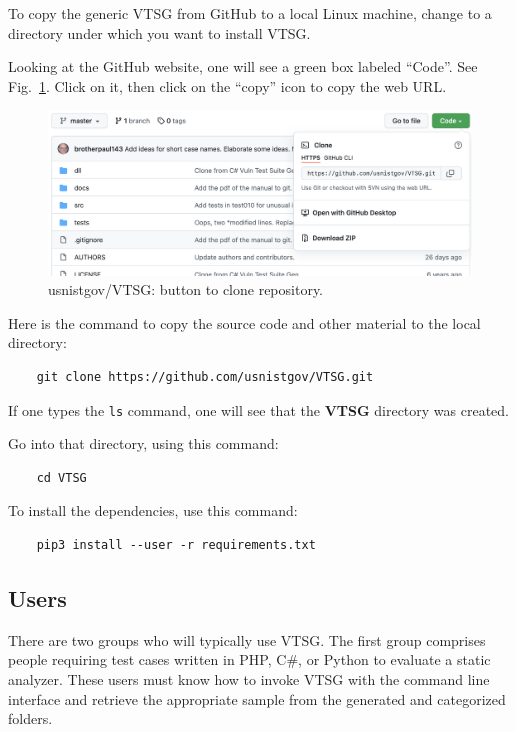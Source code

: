 \documentclass[12pt]{article}
\newcommand{\CSharp}{C{\fontseries{b}\selectfont\#}}
\begin{document}
\noindent To copy the generic VTSG from GitHub to a local Linux machine, change to a
directory under which you want to install VTSG.

\noindent Looking at the GitHub website, one will see a green box labeled ``Code''.
See Fig.~\ref{fig:clone button}.
Click on it, then click on the ``copy'' icon to copy the web URL.

\begin{figure}[htbp]
  \includegraphics[width=1\linewidth]{fig_clone_tab.png}
  \caption{usnistgov/VTSG: button to clone repository.}
  \label{fig:clone button}
\end{figure}

\noindent Here is the command to copy the source code and other material to the local
directory:

\begin{verbatim}
    git clone https://github.com/usnistgov/VTSG.git
\end{verbatim}

\noindent If one types the \verb|ls| command, one will see that the \textbf{VTSG}
directory was created.

\noindent Go into that directory, using this command:

\begin{verbatim}
    cd VTSG
\end{verbatim}

\noindent To install the dependencies, use this command:

\begin{verbatim}
    pip3 install --user -r requirements.txt
\end{verbatim}


\subsection{Users}

There are two groups who will typically use VTSG. The first group comprises people
requiring test cases written in PHP, \CSharp, or Python to evaluate a static
analyzer. These users must know how to invoke VTSG with the command line interface
and retrieve the appropriate sample from the generated and categorized folders.
\end{document}
